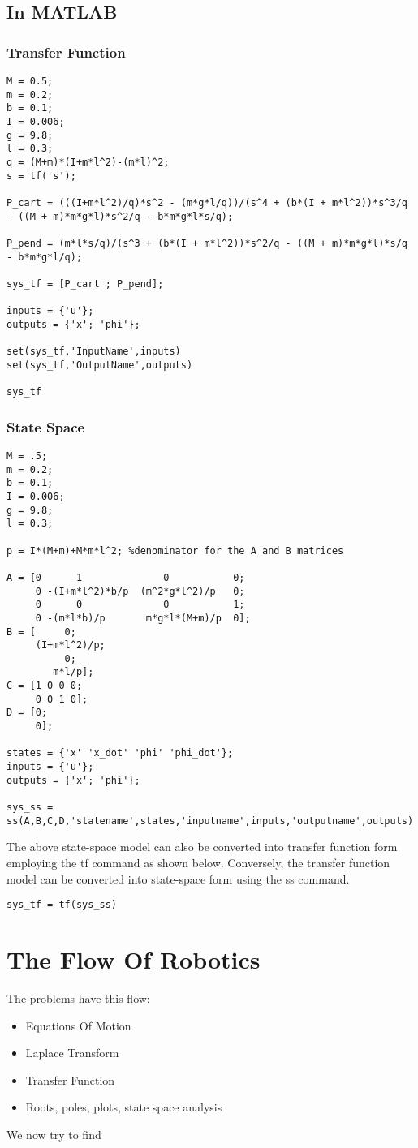 \documentclass{report}
\begin{document}
\subsection{In MATLAB}
\subsubsection{Transfer Function}
\begin{lstlisting}
M = 0.5;
m = 0.2;
b = 0.1;
I = 0.006;
g = 9.8;
l = 0.3;
q = (M+m)*(I+m*l^2)-(m*l)^2;
s = tf('s');

P_cart = (((I+m*l^2)/q)*s^2 - (m*g*l/q))/(s^4 + (b*(I + m*l^2))*s^3/q - ((M + m)*m*g*l)*s^2/q - b*m*g*l*s/q);

P_pend = (m*l*s/q)/(s^3 + (b*(I + m*l^2))*s^2/q - ((M + m)*m*g*l)*s/q - b*m*g*l/q);

sys_tf = [P_cart ; P_pend];

inputs = {'u'};
outputs = {'x'; 'phi'};

set(sys_tf,'InputName',inputs)
set(sys_tf,'OutputName',outputs)

sys_tf
\end{lstlisting}
\subsubsection{State Space}
\begin{lstlisting}
M = .5;
m = 0.2;
b = 0.1;
I = 0.006;
g = 9.8;
l = 0.3;

p = I*(M+m)+M*m*l^2; %denominator for the A and B matrices

A = [0      1              0           0;
     0 -(I+m*l^2)*b/p  (m^2*g*l^2)/p   0;
     0      0              0           1;
     0 -(m*l*b)/p       m*g*l*(M+m)/p  0];
B = [     0;
     (I+m*l^2)/p;
          0;
        m*l/p];
C = [1 0 0 0;
     0 0 1 0];
D = [0;
     0];

states = {'x' 'x_dot' 'phi' 'phi_dot'};
inputs = {'u'};
outputs = {'x'; 'phi'};

sys_ss = ss(A,B,C,D,'statename',states,'inputname',inputs,'outputname',outputs)
\end{lstlisting}
The above state-space model can also be converted into transfer function form employing the tf command as shown below. Conversely, the transfer function model can be converted into state-space form using the ss command. 
\begin{lstlisting}
sys_tf = tf(sys_ss)
\end{lstlisting}
\section{The Flow Of Robotics}
The problems have this flow:
\begin{itemize}
	\item Equations Of Motion
	\item Laplace Transform
	\item Transfer Function
	\item Roots, poles, plots, state space analysis
\end{itemize}
We now try to find 
\end{document}
